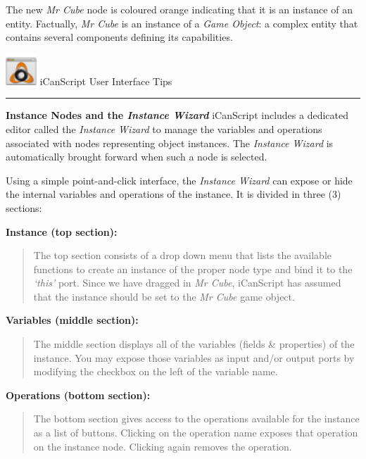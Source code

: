 The new \emph{Mr Cube} node is coloured orange indicating that it is an instance of an entity. Factually, \emph{Mr Cube} is an instance of a \emph{Game Object}: a complex entity that contains several components defining its capabilities.
\begin{tipbox}

\includegraphics[width=33pt,height=33pt]{icanscript-ui-tips_32x32x32.png} {\Large \color{black} iCanScript User Interface Tips }

\begin{center}\rule{\textwidth}{0.4pt}\end{center}

\textbf{Instance Nodes and the \emph{Instance Wizard}}
iCanScript includes a dedicated editor called the \emph{Instance Wizard} to manage the variables and operations associated with nodes representing object instances. The \emph{Instance Wizard} is automatically brought forward when such a node is selected.

Using a simple point-and-click interface, the \emph{Instance Wizard} can expose or hide the internal variables and operations of the instance. It is divided in three (3) sections:

\textbf{Instance (top section):}

\begin{quote}

The top section consists of a drop down menu that lists the available functions to create an instance of the proper node type and bind it to the \emph{`this'} port. Since we have dragged in \emph{Mr Cube}, iCanScript has assumed that the instance should be set to the \emph{Mr Cube} game object.
\end{quote}

\textbf{Variables (middle section):}

\begin{quote}

The middle section displays all of the variables (fields \& properties) of the instance. You may expose those variables as input and\slash or output ports by modifying the checkbox on the left of the variable name.
\end{quote}

\textbf{Operations (bottom section):}

\begin{quote}

The bottom section gives access to the operations available for the instance as a list of buttons. Clicking on the operation name exposes that operation on the instance node. Clicking again removes the operation.
\end{quote}

\end{tipbox}



